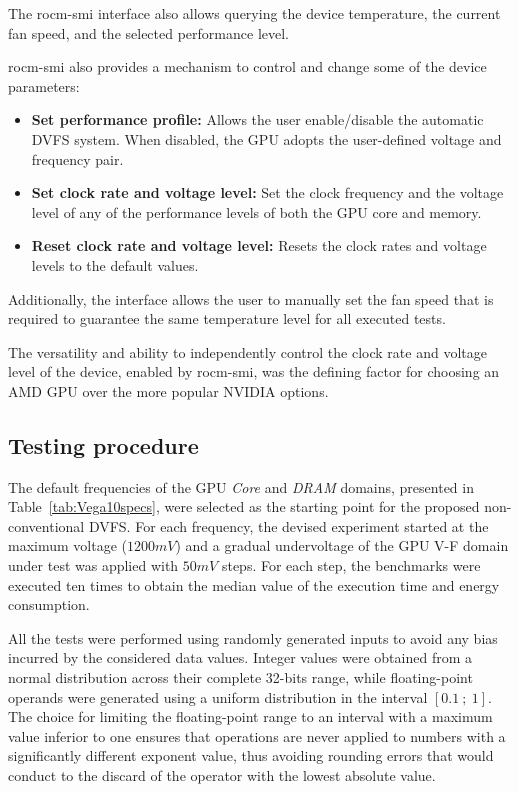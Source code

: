 The rocm-smi interface also allows querying the device temperature, the current fan speed, and the selected performance level.

rocm-smi also provides a mechanism to control and change some of the device parameters:
\begin{itemize}
\item \textbf{Set performance profile:} Allows the user enable/disable the automatic DVFS system. When disabled, the GPU adopts the user-defined voltage and frequency pair.
\item \textbf{Set clock rate and voltage level:} Set the clock frequency and the voltage level of any of the performance levels of both the GPU core and memory. 
\item \textbf{Reset clock rate and voltage level:} Resets the clock rates and voltage levels to the default values.
\end{itemize}

Additionally, the interface allows the user to manually set the fan speed that is required to guarantee the same temperature level for all executed tests.

The versatility and ability to independently control the clock rate and voltage level of the device, enabled by rocm-smi, was the defining factor for choosing an AMD GPU over the more popular NVIDIA options.


\subsection{Testing procedure}

The default frequencies of the GPU \textit{Core} and \textit{DRAM} domains, presented in Table~\ref{tab:Vega10specs}, were selected as the starting point for the proposed non-conventional DVFS. For each frequency, the devised experiment started at the maximum voltage ($1200mV$) and a gradual undervoltage of the GPU V-F domain under test was applied with $50mV$ steps. For each step, the benchmarks were executed ten times to obtain the median value of the execution time and energy consumption. 

All the tests were performed using randomly generated inputs to avoid any bias incurred by the considered data values. Integer values were obtained from a normal distribution across their complete 32-bits range, while floating-point operands were generated using a uniform distribution in the interval $[0.1~;~1]$. The choice for limiting the floating-point range to an interval with a maximum value inferior to one ensures that operations are never applied to numbers with a significantly different exponent value, thus avoiding rounding errors that would conduct to the discard of the operator with the lowest absolute value.

